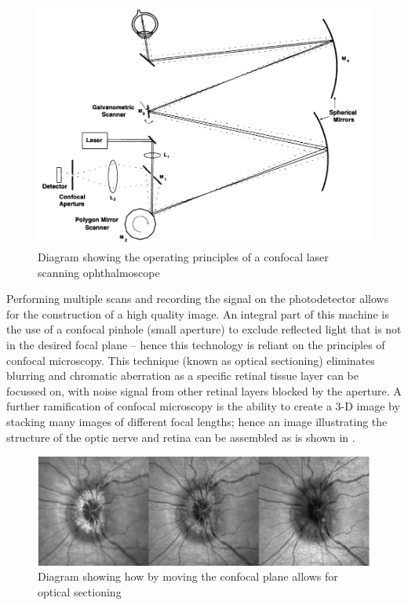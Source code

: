\begin{figure}[htbp]
\centering
  \includegraphics{figures/cslo}
\caption{Diagram showing the operating principles of a confocal laser scanning ophthalmoscope }
\label{fig:cslo}
\end{figure}


Performing multiple scans and recording the signal on the photodetector allows for the construction of a high quality image. An integral part of this machine is the use of a confocal pinhole (small aperture) to exclude reflected light that is not in the desired focal plane – hence this technology is reliant on the principles of confocal microscopy. This technique (known as optical sectioning) eliminates blurring and chromatic aberration as a specific retinal tissue layer can be focussed on, with noise signal from other retinal layers blocked by the aperture. A further ramification of confocal microscopy is the ability to create a 3-D image by stacking many images of different focal lengths; hence an image illustrating the structure of the optic nerve and retina can be assembled as is shown in .

\begin{figure}[htbp]
\centering
  \includegraphics{figures/confocalimages}
\caption{Diagram showing how by moving the confocal plane allows for optical sectioning}
\label{fig:3dconfocal}
\end{figure}

